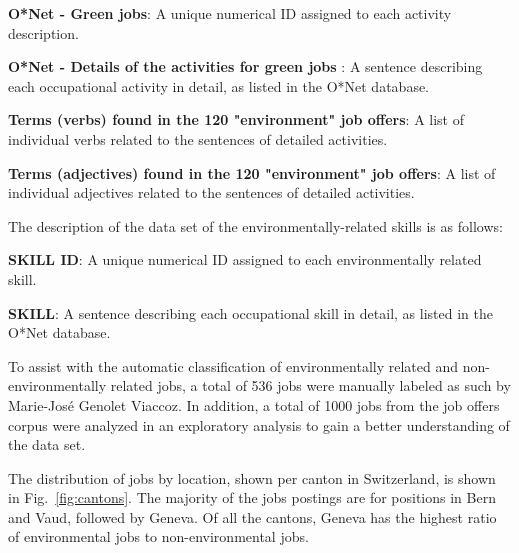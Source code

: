 \textbf{O*Net - Green jobs}: A unique numerical ID assigned to each activity description.

\textbf{O*Net - Details of the activities for green jobs }: A sentence describing each occupational activity in detail, as listed in the O*Net database. 

\textbf{Terms (verbs) found in the 120 "environment" job offers}: A list of individual verbs related to the sentences of detailed activities.

\textbf{Terms (adjectives) found in the 120 "environment" job offers}: A list of individual adjectives related to the sentences of detailed activities. 

The description of the data set of the environmentally-related skills is as follows: 

\textbf{SKILL ID}: A unique numerical ID assigned to each environmentally related skill.

\textbf{SKILL}:  A sentence describing each occupational skill in detail, as listed in the O*Net database. 

To assist with the automatic classification of environmentally related and non-environmentally related jobs, a total of 536 jobs were manually labeled as such by Marie-José Genolet Viaccoz. In addition, a total of 1000 jobs from the job offers corpus were analyzed in an exploratory analysis to gain a better understanding of the data set. 

The distribution of jobs by location, shown per canton in Switzerland, is shown in Fig.~\ref{fig:cantons}. The majority of the jobs postings are for positions in Bern and Vaud, followed by Geneva. Of all the cantons, Geneva has the highest ratio of environmental jobs to non-environmental jobs. 

